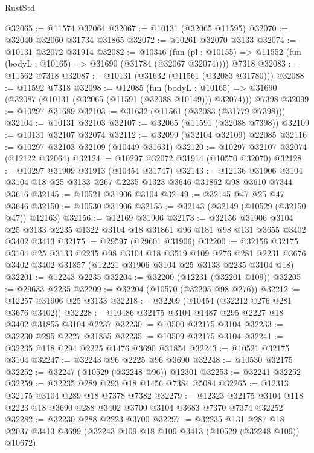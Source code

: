\begin{lexlean}{RustStd}
\begin{coremodule}
@32065 := @11574 @32064
@32067 := @10131 (@32065 @11595)
@32070 := @32040 @32060 @31734 @31865
@32072 := @10261 @32070 @3133
@32074 := @10131 @32072 @31914
@32082 := @10346
    (fun (pl : @10155) => @11552 (fun (bodyL : @10165) => @31690 (@31784 (@32067 @32074))))
    @7318
@32083 := @11562 @7318
@32087 := @10131 (@31632 (@11561 (@32083 @31780)))
@32088 := @11592 @7318
@32098 := @12085
    (fun (bodyL : @10165) => @31690 (@32087 (@10131 (@32065 (@11591 (@32088 @10149))) @32074)))
    @7398
@32099 := @10297 @31689
@32103 := @31632 (@11561 (@32083 (@31779 @7398)))
@32104 := @10131 @32103
@32107 := @32065 (@11591 (@32088 @7398))
@32109 := @10131 @32107 @32074
@32112 := @32099 (@32104 @32109) @22085
@32116 := @10297 @32103 @32109 (@10449 @31631)
@32120 := @10297 @32107 @32074 (@12122 @32064)
@32124 := @10297 @32072 @31914 (@10570 @32070)
@32128 := @10297 @31909 @31913 (@10454 @31747)
@32143 := @12136
    @31906
    @3104
    @3104
    @18
    @25
    @3133
    @267
    @2235
    @1323
    @3646
    @31862
    @98
    @3610
    @7344
    @3616
@32145 := @10521 @31906 @3104
@32149 := @32145 @47 @25 @47 @3646
@32150 := @10530 @31906
@32155 := @32143 (@32149 (@10529 (@32150 @47)) @12163)
@32156 := @12169 @31906
@32173 := @32156
    @31906
    @3104
    @25
    @3133
    @2235
    @1322
    @3104
    @18
    @31861
    @96
    @181
    @98
    @131
    @3655
    @3402
    @3402
    @3413
@32175 := @29597 (@29601 @31906)
@32200 := @32156
    @32175
    @3104
    @25
    @3133
    @2235
    @98
    @3104
    @18
    @3519
    @109
    @276
    @281
    @2231
    @3676
    @3402
    @3402
    @31857
    (@12221 @31906 @3104 @25 @3133 @2235 @3104 @18)
@32201 := @12243 @2235
@32204 := @32200 (@12231 (@32201 @109))
@32205 := @29633 @2235
@32209 := @32204 (@10570 (@32205 @98 @276))
@32212 := @12257 @31906 @25 @3133
@32218 := @32209 (@10454 (@32212 @276 @281 @3676 @3402))
@32228 := @10486 @32175 @3104 @1487 @295 @2227 @18 @3402 @31855 @3104 @2237
@32230 := @10500 @32175 @3104
@32233 := @32230 @295 @2227 @31855
@32235 := @10509 @32175 @3104
@32241 := @32235 @118 @294 @2225 @1476 @3690 @31854
@32243 := @10521 @32175 @3104
@32247 := @32243 @96 @2225 @96 @3690
@32248 := @10530 @32175
@32252 := @32247 (@10529 (@32248 @96)) @12301
@32253 := @32241 @32252
@32259 := @32235 @289 @293 @18 @1456 @7384 @5084
@32265 := @12313 @32175 @3104 @289 @18 @7378 @7382
@32279 := @12323 @32175 @3104 @118 @2223 @18 @3690 @288 @3402 @3700 @3104 @3683 @7370 @7374 @32252
@32282 := @32230 @288 @2223 @3700
@32297 := @32235
    @131
    @287
    @18
    @2037
    @3413
    @3699
    (@32243 @109 @18 @109 @3413 (@10529 (@32248 @109)) @10672)

\end{coremodule}
\end{lexlean}
